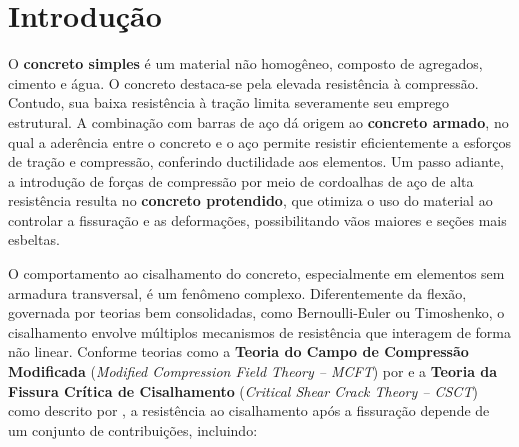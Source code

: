 


\frenchspacing

\imprimircapa
\cleardoublepage
\imprimirfolhaderosto

\tableofcontents*
\cleardoublepage

\textual

\chapter[Introdução]{Introdução}

O \textbf{concreto simples} é um material não homogêneo, composto de agregados, cimento e água. O concreto destaca-se pela elevada resistência à compressão. Contudo, sua baixa resistência à tração limita severamente seu emprego estrutural. A combinação com barras de aço dá origem ao \textbf{concreto armado}, no qual a aderência entre o concreto e o aço permite resistir eficientemente a esforços de tração e compressão, conferindo ductilidade aos elementos. Um passo adiante, a introdução de forças de compressão por meio de cordoalhas de aço de alta resistência resulta no \textbf{concreto protendido}, que otimiza o uso do material ao controlar a fissuração e as deformações, possibilitando vãos maiores e seções mais esbeltas.\cite{Araujo2023}

O comportamento ao cisalhamento do concreto, especialmente em elementos sem armadura transversal, é um fenômeno complexo. Diferentemente da flexão, governada por teorias bem consolidadas, como Bernoulli-Euler ou Timoshenko, o cisalhamento envolve múltiplos mecanismos de resistência que interagem de forma não linear. Conforme teorias como a \textbf{Teoria do Campo de Compressão Modificada} (\textit{Modified Compression Field Theory -- MCFT}) por \textcite{Vecchio1986} e a \textbf{Teoria da Fissura Crítica de Cisalhamento} (\textit{Critical Shear Crack Theory -- CSCT}) como descrito por \textcite{Muttoni2023}, a resistência ao cisalhamento após a fissuração depende de um conjunto de contribuições, incluindo:

